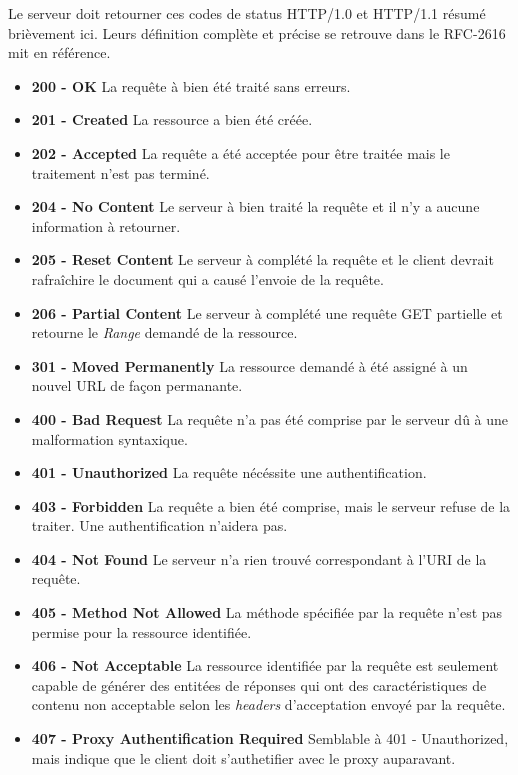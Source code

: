 \documentclass{scrreprt}
\begin{document}
Le serveur doit retourner ces codes de status HTTP/1.0 et HTTP/1.1 résumé brièvement ici. Leurs définition complète et précise se retrouve dans le RFC-2616 mit en référence. \\
 \begin{itemize}
 \item \textbf{200 - OK}
 \subitem La requête à bien été traité sans erreurs.
 \item \textbf{201 - Created}
 \subitem La ressource a bien été créée.
 \item \textbf{202 - Accepted}
 \subitem La requête a été acceptée pour être traitée mais le traitement n'est pas terminé.
 \item \textbf{204 - No Content}
 \subitem Le serveur à bien traité la requête et il n'y a aucune information à retourner.
 \item \textbf{205 - Reset Content}
 \subitem Le serveur à complété la requête et le client devrait rafraîchire le document qui a causé l'envoie de la requête.
 \item \textbf{206 - Partial Content}
 \subitem Le serveur à complété une requête GET partielle et retourne le \textit{Range} demandé de la ressource.
 \item \textbf{301 - Moved Permanently}
 \subitem La ressource demandé à été assigné à un nouvel URL de façon permanante.
 \item \textbf{400 - Bad Request}
 \subitem La requête n'a pas été comprise par le serveur dû à une malformation syntaxique. 
 \item \textbf{401 - Unauthorized}
 \subitem La requête nécéssite une authentification.
 \item \textbf{403 - Forbidden}
 \subitem La requête a bien été comprise, mais le serveur refuse de la traiter. Une authentification n'aidera pas.
 \item \textbf{404 - Not Found}
 \subitem Le serveur n'a rien trouvé correspondant à l'URI de la requête.
 \item \textbf{405 - Method Not Allowed}
 \subitem La méthode spécifiée par la requête n'est pas permise pour la ressource identifiée.
 \item \textbf{406 - Not Acceptable}
 \subitem La ressource identifiée par la requête est seulement capable de générer des entitées de réponses qui ont des caractéristiques de contenu non acceptable selon les \textit{headers} d'acceptation envoyé par la requête.
 \item \textbf{407 - Proxy Authentification Required}
 \subitem Semblable à 401 - Unauthorized, mais indique que le client doit s'authetifier avec le proxy auparavant.

\end{itemize}
\end{document}

